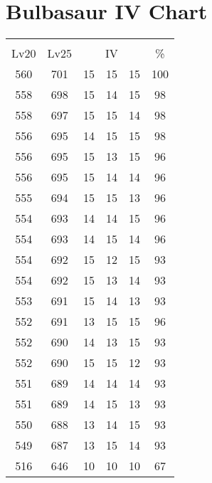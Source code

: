 \documentclass{article}%
\begin{document}
%
\normalsize%
\section{Bulbasaur IV Chart}%
\label{sec:Bulbasaur IV Chart}%
\renewcommand{\arraystretch}{1.5}%
\begin{tabular}{|c|c|c|c|c|c|}%
\hline%
\multicolumn{6}{|c|}{\textcolor{white}{ 
\linebreak{Bulbasaur}
}%
\cellcolor{black}}\\%
\multicolumn{1}{|c}{Lv20}&\multicolumn{1}{c|}{Lv25}&\multicolumn{3}{c|}{IV}&\multicolumn{1}{|c|}{\%}\\%
\hline%
\rowcolor{color100}%
560&701&15&15&15&100\\%
\hline%
\rowcolor{color98}%
558&698&15&14&15&98\\%
\hline%
\rowcolor{color98}%
558&697&15&15&14&98\\%
\hline%
\rowcolor{color98}%
556&695&14&15&15&98\\%
\hline%
\rowcolor{color96}%
556&695&15&13&15&96\\%
\hline%
\rowcolor{color96}%
556&695&15&14&14&96\\%
\hline%
\rowcolor{color96}%
555&694&15&15&13&96\\%
\hline%
\rowcolor{color96}%
554&693&14&14&15&96\\%
\hline%
\rowcolor{color96}%
554&693&14&15&14&96\\%
\hline%
\rowcolor{color93}%
554&692&15&12&15&93\\%
\hline%
\rowcolor{color93}%
554&692&15&13&14&93\\%
\hline%
\rowcolor{color93}%
553&691&15&14&13&93\\%
\hline%
\rowcolor{color96}%
552&691&13&15&15&96\\%
\hline%
\rowcolor{color93}%
552&690&14&13&15&93\\%
\hline%
\rowcolor{color93}%
552&690&15&15&12&93\\%
\hline%
\rowcolor{color93}%
551&689&14&14&14&93\\%
\hline%
\rowcolor{color93}%
551&689&14&15&13&93\\%
\hline%
\rowcolor{color93}%
550&688&13&14&15&93\\%
\hline%
\rowcolor{color93}%
549&687&13&15&14&93\\%
\hline%
\rowcolor{color91}%
516&646&10&10&10&67\\%
\end{tabular}

%
\end{document}

